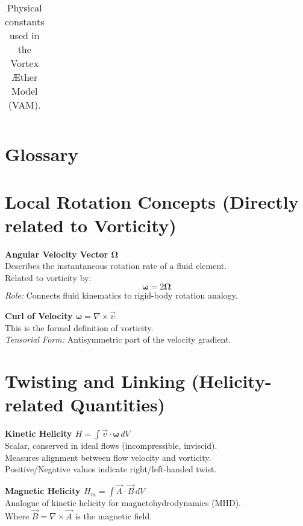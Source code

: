\documentclass[a4paper, aps,preprint,superscriptaddress, 12pt]{revtex4}
\begin{document}
\begin{table}[H]
\begin{tabular}{|l|l|l|l|l|}
    \end{tabular}
    \caption{Physical constants used in the Vortex Æther Model (VAM).}
    \label{tab:physical_constants}
\end{table}
%


    \section*{Glossary}




    \section*{Local Rotation Concepts (Directly related to Vorticity)}

    \textbf{Angular Velocity Vector \( \boldsymbol{\Omega} \)} \\
    Describes the instantaneous rotation rate of a fluid element. \\
    Related to vorticity by:
    \[
        \boldsymbol{\omega} = 2 \boldsymbol{\Omega}
    \]
    \textit{Role:} Connects fluid kinematics to rigid-body rotation analogy.

    \medskip
    \textbf{Curl of Velocity \( \boldsymbol{\omega} = \nabla \times \vec{v} \)} \\
    This is the formal definition of vorticity. \\
    \textit{Tensorial Form:} Antisymmetric part of the velocity gradient.

    \section*{Twisting and Linking (Helicity-related Quantities)}

    \textbf{Kinetic Helicity \( H = \int \vec{v} \cdot \boldsymbol{\omega} \, dV \)} \\
    Scalar, conserved in ideal flows (incompressible, inviscid). \\
    Measures alignment between flow velocity and vorticity. \\
    Positive/Negative values indicate right/left-handed twist.

    \medskip
    \textbf{Magnetic Helicity \( H_m = \int \vec{A} \cdot \vec{B} \, dV \)} \\
    Analogue of kinetic helicity for magnetohydrodynamics (MHD). \\
    Where \( \vec{B} = \nabla \times \vec{A} \) is the magnetic field.
\end{document}
